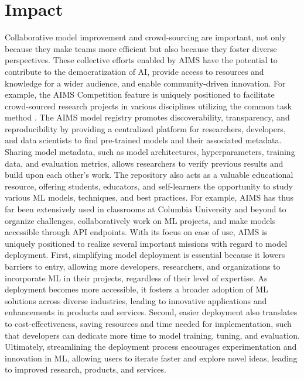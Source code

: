 \section{Impact}
Collaborative model improvement and crowd-sourcing are important, not only because they make teams more efficient but also because they foster diverse perspectives. These collective efforts enabled by AIMS have the potential to contribute to the democratization of AI, provide access to resources and knowledge for a wider audience, and enable community-driven innovation. For example, the AIMS Competition feature is uniquely positioned to facilitate crowd-sourced research projects in various disciplines utilizing the common task method \citep{salganik_measuring_2020}. 
The AIMS model registry promotes discoverability, transparency, and reproducibility by providing a centralized platform for researchers, developers, and data scientists to find pre-trained models and their associated metadata. Sharing model metadata, such as model architectures, hyperparameters, training data, and evaluation metrics, allows researchers to verify previous results and build upon each other's work. The repository also acts as a valuable educational resource, offering students, educators, and self-learners the opportunity to study various ML models, techniques, and best practices. For example, AIMS has thus far been extensively used in classrooms at Columbia University and beyond to organize challenges, collaboratively work on ML projects, and make models accessible through API endpoints. 
With its focus on ease of use, AIMS is uniquely positioned to realize several important missions with regard to model deployment. First, simplifying model deployment is essential because it lowers barriers to entry, allowing more developers, researchers, and organizations to incorporate ML in their projects, regardless of their level of expertise. As deployment becomes more accessible, it fosters a broader adoption of ML solutions across diverse industries, leading to innovative applications and enhancements in products and services. Second, easier deployment also translates to cost-effectiveness, saving resources and time needed for implementation, such that developers can dedicate more time to model training, tuning, and evaluation. Ultimately, streamlining the deployment process encourages experimentation and innovation in ML, allowing users to iterate faster and explore novel ideas, leading to improved research, products, and services. 


